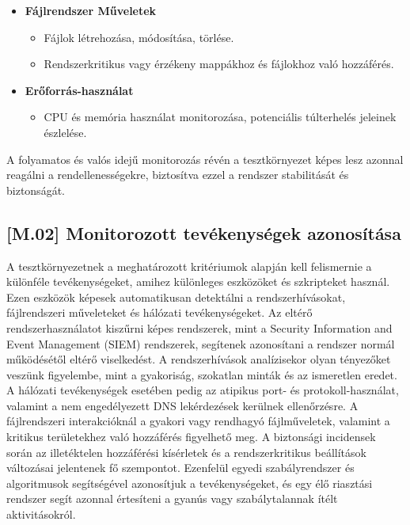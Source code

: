 \documentclass{scrreprt}
\begin{document}
\begin{itemize}
      \item \textbf{Fájlrendszer Műveletek}
            \begin{itemize}
                  \item  Fájlok létrehozása, módosítása, törlése.
            \end{itemize}
            \begin{itemize}
                  \item  Rendszerkritikus vagy érzékeny mappákhoz és fájlokhoz való hozzáférés.
            \end{itemize}
\end{itemize}

\begin{itemize}
      \item \textbf{Erőforrás-használat}
            \begin{itemize}
                  \item  CPU és memória használat monitorozása, potenciális túlterhelés jeleinek észlelése.
            \end{itemize}
\end{itemize}

A folyamatos és valós idejű monitorozás révén a tesztkörnyezet képes lesz azonnal reagálni a rendellenességekre, biztosítva ezzel a rendszer stabilitását és
biztonságát.

\subsection{[M.02] Monitorozott tevékenységek azonosítása} \label{M.02}
A tesztkörnyezetnek a meghatározott kritériumok alapján kell felismernie a különféle tevékenységeket, amihez különleges eszközöket és szkripteket használ. Ezen
eszközök képesek automatikusan detektálni a rendszerhívásokat, fájlrendszeri műveleteket és hálózati tevékenységeket. Az eltérő rendszerhasználatot kiszűrni
képes rendszerek, mint a Security Information and Event Management (SIEM) rendszerek, segítenek azonosítani a rendszer normál működésétől eltérő viselkedést. A
rendszerhívások analízisekor olyan tényezőket veszünk figyelembe, mint a gyakoriság, szokatlan minták és az ismeretlen eredet. A hálózati tevékenységek
esetében pedig az atipikus port- és protokoll-használat, valamint a nem engedélyezett DNS lekérdezések kerülnek ellenőrzésre. A fájlrendszeri interakcióknál a
gyakori vagy rendhagyó fájlműveletek, valamint a kritikus területekhez való hozzáférés figyelhető meg. A biztonsági incidensek során az illetéktelen
hozzáférési kísérletek és a rendszerkritikus beállítások változásai jelentenek fő szempontot. Ezenfelül egyedi szabályrendszer és algoritmusok segítségével
azonosítjuk a tevékenységeket, és egy élő riasztási rendszer segít azonnal értesíteni a gyanús vagy szabálytalannak ítélt aktivitásokról.
\end{document}
